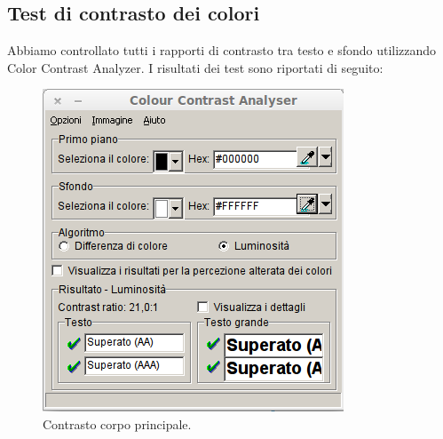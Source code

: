 \documentclass[a4paper]{article}
\begin{document}
\newpage 
\clearpage
\subsection{Test di contrasto dei colori}
Abbiamo controllato tutti i rapporti di contrasto tra testo e sfondo utilizzando Color Contrast Analyzer. I risultati dei test sono riportati di seguito:


\begin{figure}[htbp]
\begin{minipage}[b]{0.47\textwidth}
\centering
\includegraphics[width=\textwidth]{test/contrasto/Test_Body.png}
\caption{\label{f_etichetta}Contrasto corpo principale.}
\end{minipage}
\hfill
\begin{minipage}[b]{0.47\textwidth}

\end{minipage}
\end{figure}
\end{document}
